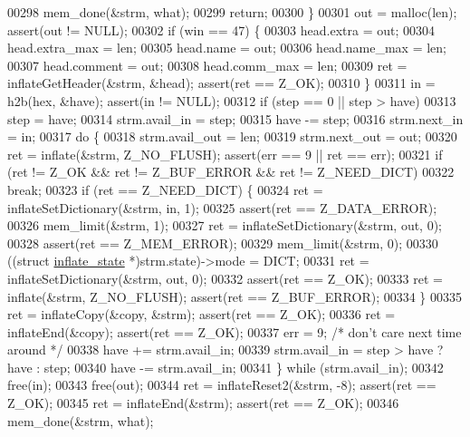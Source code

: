\begin{DoxyCode}
{{{{{00298         mem\_done(&strm, what);
00299         \textcolor{keywordflow}{return};
00300     \}
00301     out = malloc(len);                          assert(out != NULL);
00302     \textcolor{keywordflow}{if} (win == 47) \{
00303         head.extra = out;
00304         head.extra\_max = len;
00305         head.name = out;
00306         head.name\_max = len;
00307         head.comment = out;
00308         head.comm\_max = len;
00309         ret = inflateGetHeader(&strm, &head);   assert(ret == Z\_OK);
00310     \}
00311     in = h2b(hex, &have);                       assert(in != NULL);
00312     \textcolor{keywordflow}{if} (step == 0 || step > have)
00313         step = have;
00314     strm.avail\_in = step;
00315     have -= step;
00316     strm.next\_in = in;
00317     \textcolor{keywordflow}{do} \{
00318         strm.avail\_out = len;
00319         strm.next\_out = out;
00320         ret = inflate(&strm, Z\_NO\_FLUSH);       assert(err == 9 || ret == err);
00321         \textcolor{keywordflow}{if} (ret != Z\_OK && ret != Z\_BUF\_ERROR && ret != Z\_NEED\_DICT)
00322             \textcolor{keywordflow}{break};
00323         \textcolor{keywordflow}{if} (ret == Z\_NEED\_DICT) \{
00324             ret = inflateSetDictionary(&strm, in, 1);
00325                                                 assert(ret == Z\_DATA\_ERROR);
00326             mem\_limit(&strm, 1);
00327             ret = inflateSetDictionary(&strm, out, 0);
00328                                                 assert(ret == Z\_MEM\_ERROR);
00329             mem\_limit(&strm, 0);
00330             ((\textcolor{keyword}{struct }\hyperlink{structinflate__state}{inflate\_state} *)strm.state)->mode = DICT;
00331             ret = inflateSetDictionary(&strm, out, 0);
00332                                                 assert(ret == Z\_OK);
00333             ret = inflate(&strm, Z\_NO\_FLUSH);   assert(ret == Z\_BUF\_ERROR);
00334         \}
00335         ret = inflateCopy(&copy, &strm);        assert(ret == Z\_OK);
00336         ret = inflateEnd(&copy);                assert(ret == Z\_OK);
00337         err = 9;                        \textcolor{comment}{/* don't care next time around */}
00338         have += strm.avail\_in;
00339         strm.avail\_in = step > have ? have : step;
00340         have -= strm.avail\_in;
00341     \} \textcolor{keywordflow}{while} (strm.avail\_in);
00342     free(in);
00343     free(out);
00344     ret = inflateReset2(&strm, -8);             assert(ret == Z\_OK);
00345     ret = inflateEnd(&strm);                    assert(ret == Z\_OK);
00346     mem\_done(&strm, what);
}}}}}
\end{DoxyCode}
